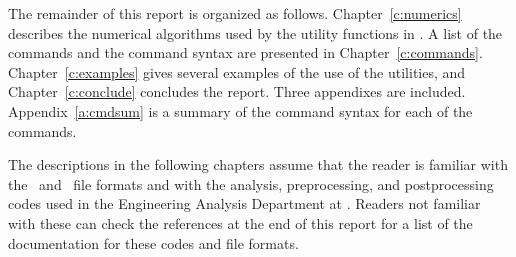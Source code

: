 The remainder of this report is organized as follows.
Chapter~\ref{c:numerics} describes the numerical algorithms used by the
utility functions in \numbers.  A list of the commands and the command
syntax are presented in Chapter~\ref{c:commands}.
Chapter~\ref{c:examples} gives several examples of the use of the
utilities, and Chapter~\ref{c:conclude} concludes the report.  Three
appendixes are included.  Appendix~\ref{a:cmdsum} is a summary of the
command syntax for each of the commands.

The descriptions in the following chapters assume that the reader is
familiar with the \gen\ and \exo\ file formats and with the analysis,
preprocessing, and postprocessing codes used in the Engineering Analysis
Department at \SNLA.  Readers not familiar with these can check the
references at the end of this report for a list of the documentation for
these codes and file formats.
